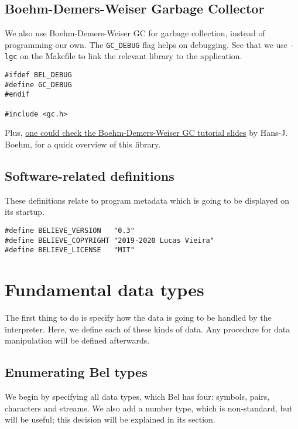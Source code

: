 \documentclass[openright,a4paper,twoside,12pt]{memoir}
\begin{document}
\section{Boehm-Demers-Weiser Garbage Collector}
\label{sec:orgb606610}

We also use Boehm-Demers-Weiser GC for garbage collection, instead of
programming our own. The \texttt{GC\_DEBUG} flag helps on debugging. See that we
use \texttt{-lgc} on the Makefile to link the relevant library to the
application.

\begin{verbatim}
#ifdef BEL_DEBUG
#define GC_DEBUG
#endif

#include <gc.h>
\end{verbatim}

Plus, \href{https://www.hboehm.info/gc/04tutorial.pdf}{one could check the Boehm-Demers-Weiser GC tutorial slides} by
Hans-J. Boehm, for a quick overview of this library.

\section{Software-related definitions}
\label{sec:orgc368540}

These definitions relate to program metadata which is going to be
displayed on its startup.

\begin{verbatim}
#define BELIEVE_VERSION   "0.3"
#define BELIEVE_COPYRIGHT "2019-2020 Lucas Vieira"
#define BELIEVE_LICENSE   "MIT"
\end{verbatim}

\chapter{Fundamental data types}
\label{sec:org40e92a6}

The first thing to do is specify how the data is going to be handled
by the interpreter. Here, we define each of these kinds of data. Any
procedure for data manipulation will be defined afterwards.

\section{Enumerating Bel types}
\label{sec:org49607c6}

We begin by specifying all data types, which Bel has four: symbols,
pairs, characters and streams. We also add a number type, which is
non-standard, but will be useful; this decision will be explained in
its section.
\end{document}
